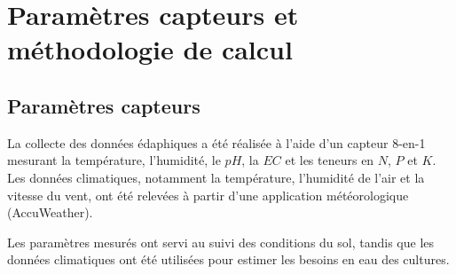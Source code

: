 \section{Paramètres capteurs et méthodologie de calcul}
\subsection{Paramètres capteurs}
La collecte des données édaphiques a été réalisée à l’aide d’un capteur 8-en-1 mesurant la température, l’humidité, le $pH$, la $EC$ et les teneurs en $N$, $P$ et $K$. 
Les données climatiques, notamment la température, l’humidité de l’air et la vitesse du vent, ont été relevées à partir d’une application météorologique (AccuWeather).

Les paramètres mesurés ont servi au suivi des conditions du sol, tandis que les données climatiques ont été utilisées pour estimer les besoins en eau des cultures.

